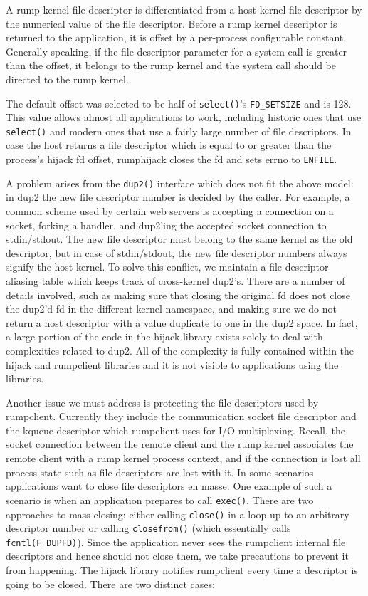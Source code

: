 A rump kernel file descriptor is differentiated from a host kernel
file descriptor by the numerical value of the file descriptor.
Before a rump kernel descriptor is returned to the application, it
is offset by a per-process configurable constant.  Generally
speaking, if the file descriptor parameter for a system call is
greater than the offset, it belongs to the rump kernel and the
system call should be directed to the rump kernel.

The default offset was selected to be half of \verb+select()+'s
\verb+FD_SETSIZE+ and is 128.  This value allows almost all applications
to work, including historic ones that use \verb+select()+ and modern
ones that use a fairly large number of file descriptors.  In case
the host returns a file descriptor which is equal to or greater
than the process's hijack fd offset, rumphijack closes the fd and
sets errno to \verb+ENFILE+.

A problem arises from the \verb+dup2()+ interface which does not
fit the above model: in dup2 the new file descriptor number is
decided by the caller.  For example, a common scheme used \eg by
certain web servers is accepting a connection on a socket, forking
a handler, and dup2'ing the accepted socket connection to stdin/stdout.
The new file descriptor must belong to the same kernel as the old
descriptor, but in case of stdin/stdout, the new file descriptor
numbers always signify the host kernel.  To solve this conflict, we maintain
a file descriptor aliasing table which keeps track of cross-kernel
dup2's.  There are a number of details involved, such as making
sure that closing the original fd does not close the dup2'd fd in
the different kernel namespace, and making sure we do not return
a host descriptor with a value duplicate to one in the dup2 space.
In fact, a large portion of the code in the hijack library exists
solely to deal with complexities related to dup2.  All of the complexity
is fully contained within the hijack and rumpclient libraries and
it is not visible to applications using the libraries.

Another issue we must address is protecting the file descriptors
used by rumpclient.  Currently they include the communication socket
file descriptor and the kqueue descriptor which rumpclient uses
for I/O multiplexing.  Recall, the socket connection between the
remote client and the rump kernel associates the remote client with a rump kernel
process context, and if the connection is lost all process state
such as file descriptors are lost with it.  In some scenarios
applications want to close file descriptors en masse.
One example of such a scenario is when an application prepares to
call \verb+exec()+.  There are two approaches to mass closing:
either calling \verb+close()+ in a loop up to an arbitrary descriptor
number or calling \verb+closefrom()+ (which essentially calls
\verb+fcntl(F_DUPFD)+).  Since the application never sees the
rumpclient internal file descriptors and hence should not close
them, we take precautions to prevent it from happening.
The hijack library notifies rumpclient every time a descriptor is
going to be closed.  There are two distinct cases:

